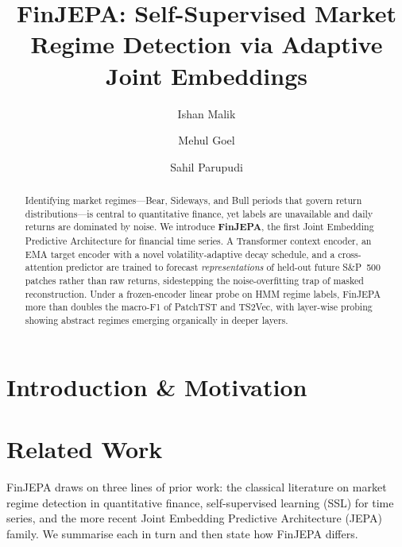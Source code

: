 \documentclass[twocolumn, 10pt]{article}
\title{FinJEPA: Self-Supervised Market Regime Detection via Adaptive Joint Embeddings}
\author[1]{Ishan Malik}
\author[1]{Mehul Goel}
\author[1]{Sahil Parupudi}
\affil[1]{Center for Data Science, New York University\\
\texttt{\{im2854, mg8958, sp9019\}@nyu.edu}}
\date{}
\begin{document}
\maketitle

\begin{abstract}
  Identifying market regimes---Bear, Sideways, and Bull periods that
  govern return distributions---is central to quantitative finance, yet
  labels are unavailable and daily returns are dominated by noise. We
  introduce \textbf{FinJEPA}, the first Joint Embedding Predictive
  Architecture for financial time series. A Transformer context encoder,
  an EMA target encoder with a novel volatility-adaptive decay schedule,
  and a cross-attention predictor are trained to forecast
  \emph{representations} of held-out future S\&P~500 patches rather than
  raw returns, sidestepping the noise-overfitting trap of masked
  reconstruction. Under a frozen-encoder linear probe on HMM regime
  labels, FinJEPA more than doubles the macro-F1 of PatchTST and
  TS2Vec, with layer-wise probing showing abstract regimes emerging
  organically in deeper layers.
\end{abstract}

\section{Introduction \& Motivation}

\section{Related Work}
\label{sec:related}

FinJEPA draws on three lines of prior work: the classical literature on
market regime detection in quantitative finance, self-supervised learning
(SSL) for time series, and the more recent Joint Embedding Predictive
Architecture (JEPA) family. We summarise each in turn and then state how
FinJEPA differs.
\end{document}
